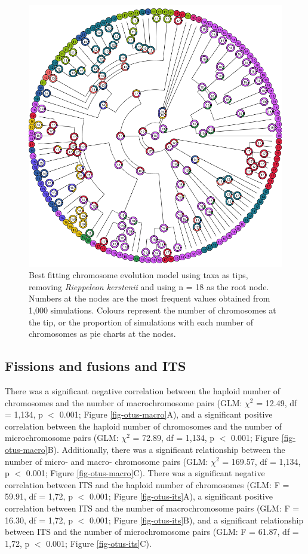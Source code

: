 \documentclass[a4paper, 12pt]{article}
\begin{document}
\begin{figure}[H]
 \centering
  \includegraphics[width = \linewidth]{figures/tree-best-model-taxa.png}
  \caption{Best fitting chromosome evolution model using taxa as tips, removing \textit{Rieppeleon kerstenii} and using n = 18 as the root node. Numbers at the nodes are the most frequent values obtained from 1,000 simulations. Colours represent the number of chromosomes at the tip, or the proportion of simulations with each number of chromosomes as pie charts at the nodes.
}
  \label{fig-otus-models}
\end{figure} 

\subsection{Fissions and fusions and ITS}
There was a significant negative correlation between the haploid number of chromosomes and the number of macrochromosome pairs (GLM: $\chi^2$ = 12.49, df = 1,134, p $<$ 0.001; Figure \ref{fig-otus-macro}A), and a significant positive correlation between the haploid number of chromosomes and the number of microchromosome pairs (GLM: $\chi^2$ = 72.89, df = 1,134, p $<$ 0.001; Figure \ref{fig-otus-macro}B). Additionally, there was a significant relationship between the number of micro- and macro- chromosome pairs (GLM: $\chi^2$ = 169.57, df = 1,134, p $<$ 0.001; Figure \ref{fig-otus-macro}C). There was a significant negative correlation between ITS and the haploid number of chromosomes (GLM: F = 59.91, df = 1,72, p $<$ 0.001; Figure \ref{fig-otus-its}A), a significant positive correlation between ITS and the number of macrochromosome pairs (GLM: F = 16.30, df = 1,72, p $<$ 0.001; Figure \ref{fig-otus-its}B), and a significant relationship between ITS and the number of microchromosome pairs (GLM: F = 61.87, df = 1,72, p $<$ 0.001; Figure \ref{fig-otus-its}C). 
\end{document}
